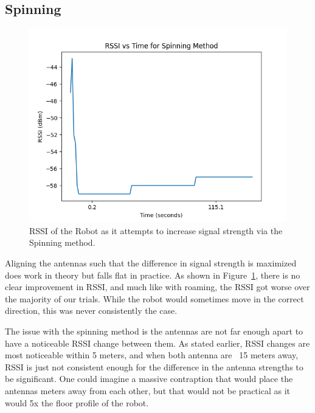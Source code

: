 \subsection{Spinning}
\begin{figure}[tp]
\centering
\includegraphics[scale=0.5]{figures/rssi_microwave}
\caption{RSSI of the Robot as it attempts to increase signal strength via the Spinning method.}
\label{fig:rssi_microwave}
\end{figure}
Aligning the antennas such that the difference in signal strength is maximized does work in theory but falls flat in practice. As shown in Figure~\ref{fig:rssi_microwave}, there is no clear improvement in RSSI, and much like with roaming, the RSSI got worse over the majority of our trials. While the robot would sometimes move in the correct direction, this was never consistently the case. 

The issue with the spinning method is the antennas are not far enough apart to have a noticeable RSSI change between them. As stated earlier, RSSI changes are most noticeable within 5 meters, and when both antenna are ~15 meters away, RSSI is just not consistent enough for the difference in the antenna strengths to be significant. One could imagine a massive contraption that would place the antennas meters away from each other, but that would not be practical as it would 5x the floor profile of the robot. 


